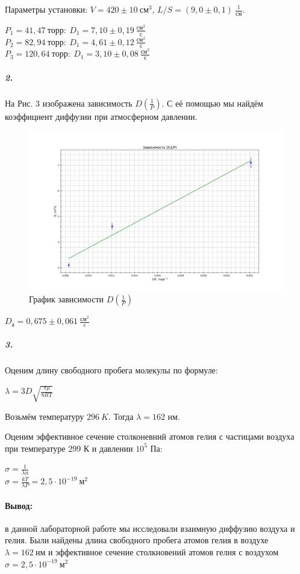 \documentclass[a4paper,12pt]{article}
\begin{document}
Параметры установки: $V = 420 \pm 10 ~см^3$, $L/S = (9,0 \pm 0,1)~ \frac{1}{см}$.
\begin{center}
    $P_1 = 41,47 ~торр: ~ D_1=7,10\pm 0,19~ \frac{см^{2}}{с}$\\
    $P_2 = 82,94 ~торр: ~ D_1=4,61\pm 0,12~ \frac{см^{2}}{с}$\\
    $P_3 = 120,64 ~торр: ~ D_1=3,10\pm 0,08~ \frac{см^{2}}{с}$
\end{center}
\newpage
\subparagraph{2.} На Рис. 3 изображена зависимость $D(\frac{1}{P})$. С её помощью мы найдём коэффициент диффузии при атмосферном давлении.
\begin{figure}[!h]
\centering
\includegraphics[width=0.8\linewidth]{D(P).png}
\caption{График зависимости $D(\frac{1}{P})$}
\label{fig:mpr}
\end{figure}
\begin{center}
    $D_{а}=0,675\pm 0,061~ \frac{см^{2}}{c}$
\end{center}
\subparagraph{3.} Оценим длину свободного пробега молекулы по формуле:
\begin{center}
$\lambda = 3D \sqrt{\frac{\pi \mu }{8RT}}$
\end{center}
Возьмём температуру $296~ K$. Тогда $\lambda=162$ нм.

Оценим эффективное сечение столконевний атомов гелия с частицами воздуха при температуре 299 К и давлении $10^5$ Па:

\begin{center}
$\sigma = \frac{1}{\lambda n}$\\
$\sigma = \frac{kT}{\lambda P} = 2,5 \cdot 10^{-19}~м^{2}$
\end{center}

\paragraph{Вывод:} в данной лабораторной работе мы исследовали взаимную диффузию воздуха и гелия. Были найдены длина свободного пробега атомов гелия в воздухе $\lambda=162~нм$ и эффективное сечение столкновений атомов гелия с воздухом $\sigma=2,5\cdot 10^{-19}~м^{2}$
\end{document}
